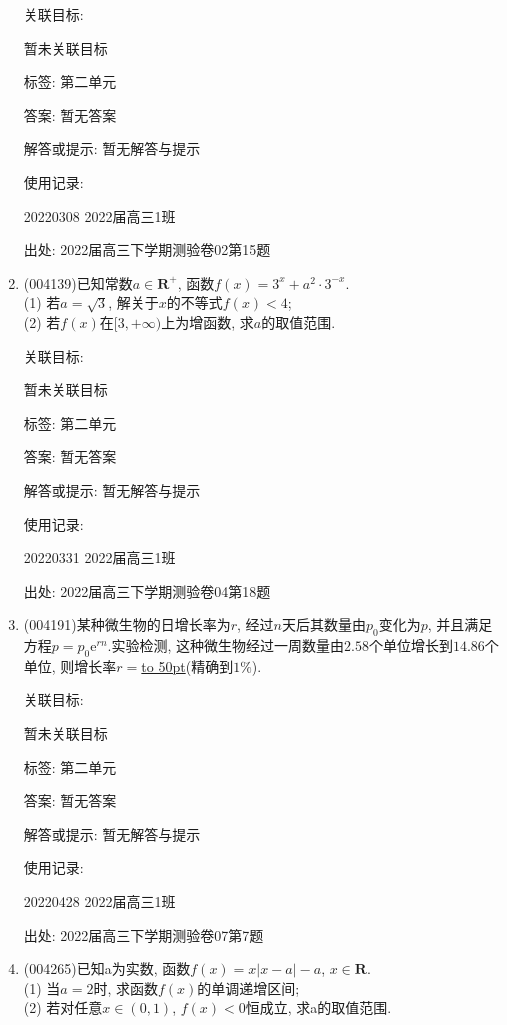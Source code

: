 \documentclass[10pt,a4paper]{article}
\newcommand{\blank}[1]{\underline{\hbox to #1pt{}}}
\begin{document}
\begin{enumerate}[1.]
关联目标:

暂未关联目标



标签: 第二单元

答案: 暂无答案

解答或提示: 暂无解答与提示

使用记录:

20220308	2022届高三1班	


出处: 2022届高三下学期测验卷02第15题
\item { (004139)}已知常数$a\in \mathbf{R}^+$, 函数$f(x)=3^x+a^2\cdot 3^{-x}$.\\
(1) 若$a=\sqrt{3}$, 解关于$x$的不等式$f(x)<4$;\\
(2) 若$f(x)$在$[3,+\infty)$上为增函数, 求$a$的取值范围.


关联目标:

暂未关联目标



标签: 第二单元

答案: 暂无答案

解答或提示: 暂无解答与提示

使用记录:

20220331	2022届高三1班		


出处: 2022届高三下学期测验卷04第18题
\item { (004191)}某种微生物的日增长率为$r$, 经过$n$天后其数量由$p_0$变化为$p$, 并且满足方程$p=p_0\mathrm{e}^{rn}$.实验检测, 这种微生物经过一周数量由$2.58$个单位增长到$14.86$个单位, 则增长率$r=$\blank{50}(精确到$1\%$).


关联目标:

暂未关联目标



标签: 第二单元

答案: 暂无答案

解答或提示: 暂无解答与提示

使用记录:

20220428	2022届高三1班	


出处: 2022届高三下学期测验卷07第7题
\item { (004265)}已知a为实数, 函数$f(x)=x|x-a|-a$, $x\in \mathbf{R}$.\\
(1) 当$a=2$时, 求函数$f(x)$的单调递增区间;\\
(2) 若对任意$x\in (0,1)$, $f(x)<0$恒成立, 求a的取值范围.



\end{enumerate}
\end{document}
